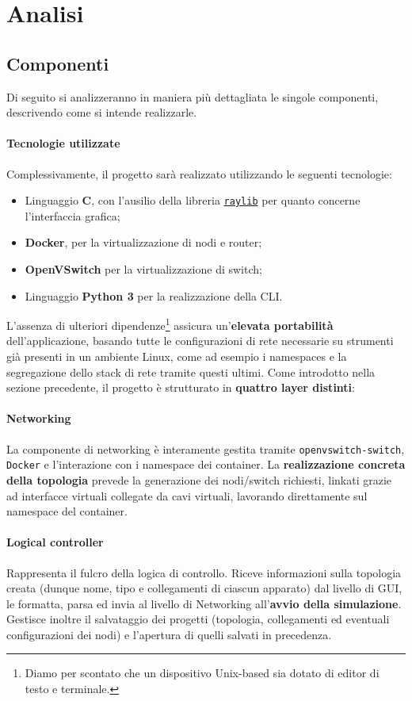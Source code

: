 \section{Analisi}
\subsection{Componenti}
Di seguito si analizzeranno in maniera più dettagliata le singole componenti, descrivendo come si intende realizzarle. 
\paragraph*{Tecnologie utilizzate} Complessivamente, il progetto sarà realizzato utilizzando le seguenti tecnologie: 
\begin{itemize}
    \item Linguaggio \textbf{C}, con l'ausilio della libreria \href{https://github.com/raysan5/raylib}{\texttt{raylib}} per quanto concerne l'interfaccia grafica;
    \item \textbf{Docker}, per la virtualizzazione di nodi e router;
    \item \textbf{OpenVSwitch} per la virtualizzazione di switch;
    \item Linguaggio \textbf{Python 3} per la realizzazione della CLI.
\end{itemize}
L'assenza di ulteriori dipendenze\footnote{Diamo per scontato che un dispositivo Unix-based sia dotato di editor di testo e terminale.} assicura un'\textbf{elevata portabilità} dell'applicazione, basando tutte le configurazioni di rete necessarie su strumenti già presenti in un ambiente Linux, come ad esempio i namespaces e la segregazione dello stack di rete tramite questi ultimi. 
\newline\newline
Come introdotto nella sezione precedente, il progetto è strutturato in \textbf{quattro layer distinti}:
\paragraph*{Networking} La componente di networking è interamente gestita tramite \texttt{openvswitch-switch}, \texttt{Docker} e l'interazione con i namespace dei container. La \textbf{realizzazione concreta della topologia} prevede la generazione dei nodi/switch richiesti, linkati grazie ad interfacce virtuali collegate da cavi virtuali, lavorando direttamente sul namespace del container. 
\paragraph*{Logical controller} Rappresenta il fulcro della logica di controllo. Riceve informazioni sulla topologia creata (dunque nome, tipo e collegamenti di ciascun apparato) dal livello di GUI, le formatta, parsa ed invia al livello di Networking all'\textbf{avvio della simulazione}. Gestisce inoltre il salvataggio dei progetti (topologia, collegamenti ed eventuali configurazioni dei nodi) e l'apertura di quelli salvati in precedenza. 
